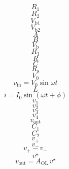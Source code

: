 \documentclass[11pt,oneside,openany,letterpaper]{article}
\begin{document}
$$
R_1
$$
$$ 
R_2
$$
$$
V_\mathrm{b1}
$$
$$
V_\mathrm{b2}
$$
$$
A
$$
$$
B
$$
$$
V_\mathrm{b}
$$
$$
R_3
$$
$$
R
$$
$$
C
$$
$$
R_\mathrm{s}
$$
$$
V_0
$$
$$
v_\mathrm{in}=V_0\sin\omega t
$$
$$
L
$$
$$
i=I_0\sin(\omega t+\phi)
$$
$$
v_1
$$
$$
v_2
$$
$$
v_3
$$
$$
v_4
$$
$$
v_\mathrm{out}
$$
$$
C_1
$$
$$
C_2
$$
$$
v_+
$$
$$
v_-
$$
$$
v_+-v_-
$$
$$
v^\star
$$
$$
v_\mathrm{out}=A_\mathrm{OL}\,v^\star
$$
\end{document}

